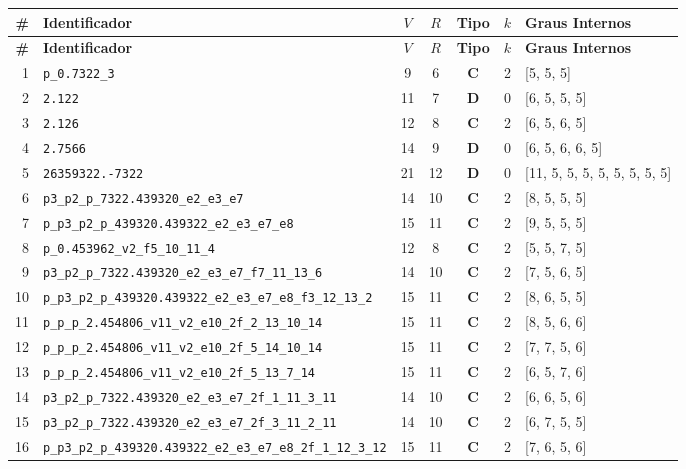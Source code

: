 \documentclass[10pt,a4paper]{article}
\begin{document}
\begin{longtable}{r l c c c c l}
\toprule
\textbf{\#} & \textbf{Identificador} & \textbf{$V$} & \textbf{$R$} & \textbf{Tipo} & \textbf{$k$} & \textbf{Graus Internos} \\
\midrule
\endfirsthead
\toprule
\textbf{\#} & \textbf{Identificador} & \textbf{$V$} & \textbf{$R$} & \textbf{Tipo} & \textbf{$k$} & \textbf{Graus Internos} \\
\midrule
\endhead
\bottomrule
\endfoot

1 & \texttt{p\_0.7322\_3} & 9 & 6 & \textbf{C} & 2 & [5, 5, 5] \\
2 & \texttt{2.122} & 11 & 7 & \textbf{D} & 0 & [6, 5, 5, 5] \\
3 & \texttt{2.126} & 12 & 8 & \textbf{C} & 2 & [6, 5, 6, 5] \\
4 & \texttt{2.7566} & 14 & 9 & \textbf{D} & 0 & [6, 5, 6, 6, 5] \\
5 & \texttt{26359322.-7322} & 21 & 12 & \textbf{D} & 0 & [11, 5, 5, 5, 5, 5, 5, 5, 5] \\
6 & \texttt{p3\_p2\_p\_7322.439320\_e2\_e3\_e7} & 14 & 10 & \textbf{C} & 2 & [8, 5, 5, 5] \\
7 & \texttt{p\_p3\_p2\_p\_439320.439322\_e2\_e3\_e7\_e8} & 15 & 11 & \textbf{C} & 2 & [9, 5, 5, 5] \\
8 & \texttt{p\_0.453962\_v2\_f5\_10\_11\_4} & 12 & 8 & \textbf{C} & 2 & [5, 5, 7, 5] \\
9 & \texttt{p3\_p2\_p\_7322.439320\_e2\_e3\_e7\_f7\_11\_13\_6} & 14 & 10 & \textbf{C} & 2 & [7, 5, 6, 5] \\
10 & \texttt{p\_p3\_p2\_p\_439320.439322\_e2\_e3\_e7\_e8\_f3\_12\_13\_2} & 15 & 11 & \textbf{C} & 2 & [8, 6, 5, 5] \\
11 & \texttt{p\_p\_p\_2.454806\_v11\_v2\_e10\_2f\_2\_13\_10\_14} & 15 & 11 & \textbf{C} & 2 & [8, 5, 6, 6] \\
12 & \texttt{p\_p\_p\_2.454806\_v11\_v2\_e10\_2f\_5\_14\_10\_14} & 15 & 11 & \textbf{C} & 2 & [7, 7, 5, 6] \\
13 & \texttt{p\_p\_p\_2.454806\_v11\_v2\_e10\_2f\_5\_13\_7\_14} & 15 & 11 & \textbf{C} & 2 & [6, 5, 7, 6] \\
14 & \texttt{p3\_p2\_p\_7322.439320\_e2\_e3\_e7\_2f\_1\_11\_3\_11} & 14 & 10 & \textbf{C} & 2 & [6, 6, 5, 6] \\
15 & \texttt{p3\_p2\_p\_7322.439320\_e2\_e3\_e7\_2f\_3\_11\_2\_11} & 14 & 10 & \textbf{C} & 2 & [6, 7, 5, 5] \\
16 & \texttt{p\_p3\_p2\_p\_439320.439322\_e2\_e3\_e7\_e8\_2f\_1\_12\_3\_12} & 15 & 11 & \textbf{C} & 2 & [7, 6, 5, 6] \\

\end{longtable}
\end{document}
